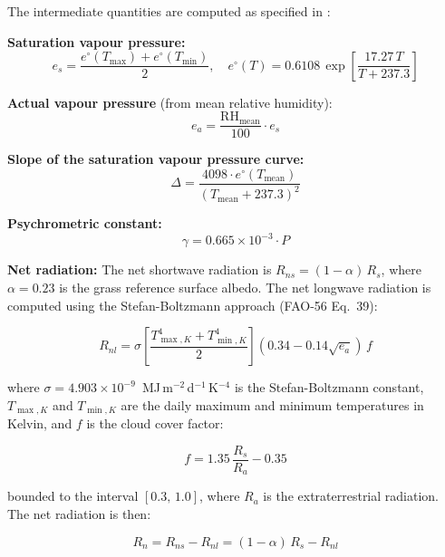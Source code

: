 \documentclass[preprint,review,12pt]{elsarticle}
\begin{document}
The intermediate quantities are computed as specified in \citet{Allen1998}:

\textbf{Saturation vapour pressure:}
\begin{equation}
e_s = \frac{e^\circ(T_{\max}) + e^\circ(T_{\min})}{2}, \quad
e^\circ(T) = 0.6108\,\exp\!\left[\frac{17.27\,T}{T + 237.3}\right]
\label{eq:es}
\end{equation}

\textbf{Actual vapour pressure} (from mean relative humidity):
\begin{equation}
e_a = \frac{\text{RH}_{\text{mean}}}{100} \cdot e_s
\label{eq:ea}
\end{equation}

\textbf{Slope of the saturation vapour pressure curve:}
\begin{equation}
\Delta = \frac{4098 \cdot e^\circ(T_{\text{mean}})}{(T_{\text{mean}} + 237.3)^2}
\label{eq:slope}
\end{equation}

\textbf{Psychrometric constant:}
\begin{equation}
\gamma = 0.665 \times 10^{-3} \cdot P
\label{eq:gamma}
\end{equation}

\textbf{Net radiation:} The net shortwave radiation is $R_{ns} = (1 - \alpha)\,R_s$,
where $\alpha = 0.23$ is the grass reference surface albedo. The net longwave
radiation is computed using the Stefan-Boltzmann approach (FAO-56 Eq.~39):

\begin{equation}
R_{nl} = \sigma \left[\frac{T_{\max,K}^4 + T_{\min,K}^4}{2}\right]
\left(0.34 - 0.14\sqrt{e_a}\right)\,f
\label{eq:rnl}
\end{equation}

\noindent where $\sigma = 4.903 \times 10^{-9}$~MJ\,m$^{-2}$\,d$^{-1}$\,K$^{-4}$
is the Stefan-Boltzmann constant, $T_{\max,K}$ and $T_{\min,K}$ are the daily
maximum and minimum temperatures in Kelvin, and $f$ is the cloud cover factor:

\begin{equation}
f = 1.35\,\frac{R_s}{R_a} - 0.35
\label{eq:cloud_factor}
\end{equation}

\noindent bounded to the interval $[0.3,\, 1.0]$, where $R_a$ is the
extraterrestrial radiation. The net radiation is then:

\begin{equation}
R_n = R_{ns} - R_{nl} = (1 - \alpha)\,R_s - R_{nl}
\label{eq:rn}
\end{equation}
\end{document}

